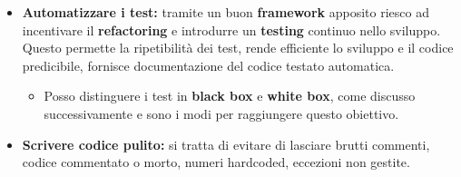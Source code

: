 \begin{itemize}
\begin{itemize}
    \end{itemize}
    \item \textbf{Automatizzare i test:} tramite un buon \textbf{framework} apposito riesco ad incentivare il \textbf{refactoring} e introdurre un \textbf{testing} continuo nello sviluppo. Questo permette la ripetibilità dei test, rende efficiente lo sviluppo e il codice predicibile, fornisce documentazione del codice testato automatica.
    \begin{itemize}
        \item Posso distinguere i test in \textbf{black box} e \textbf{white box}, come discusso successivamente e sono i modi per raggiungere questo obiettivo.
    \end{itemize}
    \item \textbf{Scrivere codice pulito:} si tratta di evitare di lasciare brutti commenti, codice commentato o morto, numeri hardcoded, eccezioni non gestite.
\end{itemize}
